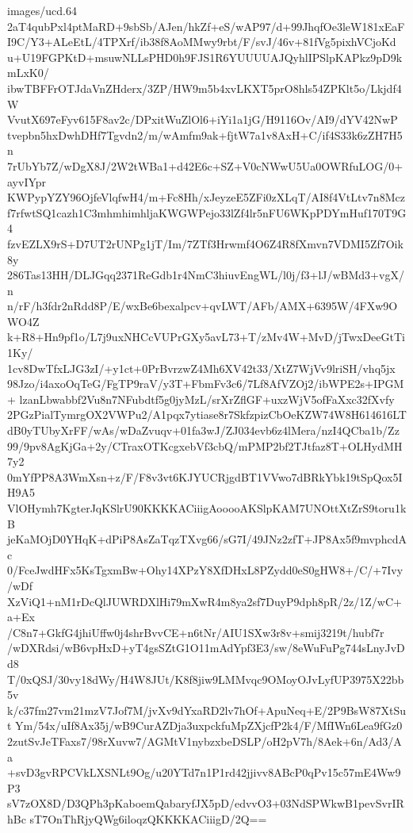 \begin{filecontents*}{images/ucd.64}
2aT4qubPxl4ptMaRD+9sbSb/AJen/hkZf+eS/wAP97/d+99JhqfOe3leW181xEaF
I9C/Y3+ALeEtL/4TPXrf/ib38f8AoMMwy9rbt/F/svJ/46v+81fVg5pixhVCjoKd
u+U19FGPKtD+msuwNLLsPHD0h9FJS1R6YUUUUAJQyhlIPSlpKAPkz9pD9kmLxK0/
ibwTBFFrOTJdaVnZHderx/3ZP/HW9m5b4xvLKXT5prO8hls54ZPKlt5o/Lkjdf4W
VvutX697eFyv615F8av2c/DPxitWuZlOl6+iYi1a1jG/H9116Ov/AI9/dYV42NwP
tvepbn5hxDwhDHf7Tgvdn2/m/wAmfm9ak+fjtW7a1v8AxH+C/if4S33k6zZH7H5n
7rUbYb7Z/wDgX8J/2W2tWBa1+d42E6c+SZ+V0cNWwU5Ua0OWRfuLOG/0+ayvIYpr
KWPypYZY96OjfeVlqfwH4/m+Fc8Hh/xJeyzeE5ZFi0zXLqT/AI8f4VtLtv7n8Mcz
f7rfwtSQ1cazh1C3mhmhimhljaKWGWPejo33lZf4lr5nFU6WKpPDYmHuf170T9G4
fzvEZLX9rS+D7UT2rUNPg1jT/Im/7ZTf3Hrwmf4O6Z4R8fXmvn7VDMI5Zf7Oik8y
286Tas13HH/DLJGqq2371ReGdb1r4NmC3hiuvEngWL/l0j/f3+lJ/wBMd3+vgX/n
n/rF/h3fdr2nRdd8P/E/wxBe6bexalpcv+qvLWT/AFb/AMX+6395W/4FXw9OWO4Z
k+R8+Hn9pf1o/L7j9uxNHCcVUPrGXy5avL73+T/zMv4W+MvD/jTwxDeeGtTi1Ky/
1cv8DwTfxLJG3zI/+y1ct+0PrBvrzwZ4Mh6XV42t33/XtZ7WjVv9lriSH/vhq5jx
98Jzo/i4axoOqTeG/FgTP9raV/y3T+FbmFv3c6/7Lf8AfVZOj2/ibWPE2s+IPGM+
lzanLbwabbf2Vu8n7NFubdtf5g0jyMzL/srXrZflGF+uxzWjV5ofFaXxc32fXvfy
2PGzPialTymrgOX2VWPu2/A1pqx7ytiase8r7SkfzpizCbOeKZW74W8H614616LT
dB0yTUbyXrFF/wAs/wDaZvuqv+01fa3wJ/ZJ034evb6z4lMera/nzI4QCba1b/Zz
99/9pv8AgKjGa+2y/CTraxOTKcgxebVf3cbQ/mPMP2bf2TJtfaz8T+OLHydMH7y2
0mYfPP8A3WmXsn+z/F/F8v3vt6KJYUCRjgdBT1VVwo7dBRkYbk19tSpQox5IH9A5
VlOHymh7KgterJqKSlrU90KKKKACiiigAooooAKSlpKAM7UNOttXtZrS9toru1kB
jeKaMOjD0YHqK+dPiP8AsZaTqzTXvg66/sG7I/49JNz2zfT+JP8Ax5f9mvphcdAc
0/FceJwdHFx5KsTgxmBw+Ohy14XPzY8XfDHxL8PZydd0eS0gHW8+/C/+7Ivy/wDf
XzViQ1+nM1rDcQlJUWRDXlHi79mXwR4m8ya2sf7DuyP9dph8pR/2z/1Z/wC+a+Ex
/C8n7+GkfG4jhiUffw0j4shrBvvCE+n6tNr/AIU1SXw3r8v+smij3219t/hubf7r
/wDXRdsi/wB6vpHxD+yT4gsSZtG1O11mAdYpf3E3/sw/8eWuFuPg744sLnyJvDd8
T/0xQSJ/30vy18dWy/H4W8JUt/K8f8jiw9LMMvqc9OMoyOJvLyfUP3975X22bb5v
k/c37fm27vm21mzV7Jof7M/jvXv9dYxaRD2lv7hOf+ApuNeq+E/2P9BsW87XtSut
Ym/54x/uIf8Ax35j/wB9CurAZDja3uxpckfuMpZXjcfP2k4/F/MfIWn6Lea9fGz0
2zutSvJeTFaxs7/98rXuvw7/AGMtV1nybzxbeDSLP/oH2pV7h/8Aek+6n/Ad3/Aa
+svD3gvRPCVkLXSNLt9Og/u20YTd7n1P1rd42jjivv8ABcP0qPv15c57mE4Ww9P3
sV7zOX8D/D3QPh3pKaboemQabaryfJX5pD/edvvO3+03NdSPWkwB1pevSvrIRhBc
sT7OnThRjyQWg6iloqzQKKKKACiiigD/2Q==
\end{filecontents*}
